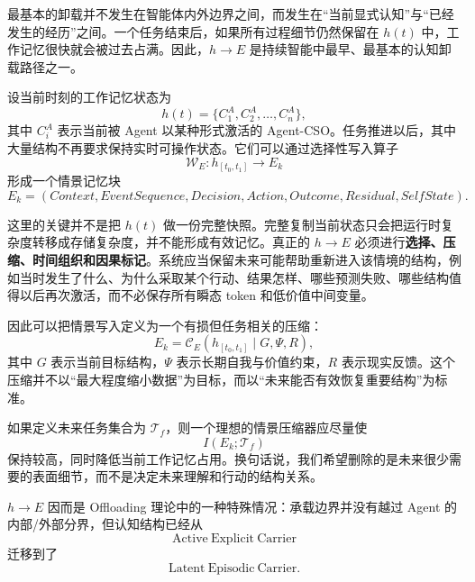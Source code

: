 最基本的卸载并不发生在智能体内外边界之间，而发生在“当前显式认知”与“已经发生的经历”之间。一个任务结束后，如果所有过程细节仍然保留在 $h(t)$ 中，工作记忆很快就会被过去占满。因此，$h\rightarrow E$ 是持续智能中最早、最基本的认知卸载路径之一。

设当前时刻的工作记忆状态为
\begin{equation}
h(t)
=
\{C_1^{A},C_2^{A},\ldots,C_n^{A}\},
\end{equation}
其中 $C_i^{A}$ 表示当前被 Agent 以某种形式激活的 Agent-CSO。任务推进以后，其中大量结构不再要求保持实时可操作状态。它们可以通过选择性写入算子
\begin{equation}
\mathcal W_E:
h_{[t_0,t_1]}
\rightarrow
E_k
\end{equation}
形成一个情景记忆块
\begin{equation}
E_k
=
(
Context,
EventSequence,
Decision,
Action,
Outcome,
Residual,
SelfState
).
\end{equation}

这里的关键并不是把 $h(t)$ 做一份完整快照。完整复制当前状态只会把运行时复杂度转移成存储复杂度，并不能形成有效记忆。真正的 $h\rightarrow E$ 必须进行\textbf{选择、压缩、时间组织和因果标记}。系统应当保留未来可能帮助重新进入该情境的结构，例如当时发生了什么、为什么采取某个行动、结果怎样、哪些预测失败、哪些结构值得以后再次激活，而不必保存所有瞬态 token 和低价值中间变量。

因此可以把情景写入定义为一个有损但任务相关的压缩：
\begin{equation}
E_k
=
\mathcal C_E
\left(
h_{[t_0,t_1]}
\mid
G,\Psi,R
\right),
\end{equation}
其中 $G$ 表示当前目标结构，$\Psi$ 表示长期自我与价值约束，$R$ 表示现实反馈。这个压缩并不以“最大程度缩小数据”为目标，而以“未来能否有效恢复重要结构”为标准。

如果定义未来任务集合为 $\mathcal T_f$，则一个理想的情景压缩器应尽量使
\begin{equation}
I(E_k;\mathcal T_f)
\end{equation}
保持较高，同时降低当前工作记忆占用。换句话说，我们希望删除的是未来很少需要的表面细节，而不是决定未来理解和行动的结构关系。

$h\rightarrow E$ 因而是 Offloading 理论中的一种特殊情况：承载边界并没有越过 Agent 的内部/外部分界，但认知结构已经从
\begin{equation}
\mathrm{Active\ Explicit\ Carrier}
\end{equation}
迁移到了
\begin{equation}
\mathrm{Latent\ Episodic\ Carrier}.
\end{equation}


